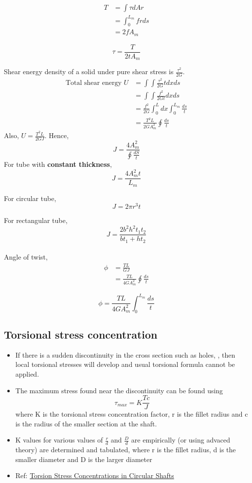 \documentclass{article}
\begin{document}
	\begin{align*}
		T &= \int \tau dA r\\
		  &= \int_0^{L_m} frds\\
		  &= 2 f A_m 
	\end{align*}

	\[\boxed{\tau= \frac{T}{2tA_m}}\]

	Shear energy density of a solid under pure shear stress is $\frac{\tau^2}{2G}$. 
	\begin{align*}
		\text{Total shear energy }U &= \int\int \frac{\tau^2}{2G} t dx ds\\
								   &= \int \int \frac{f^2}{2Gt} dx ds\\
								   &= \frac{f^2}{2G} \int_0^L dx \int_0^{L_m} \frac{ds}{t}\\
								   &= \frac{T^2 L}{2G A_m^2} \oint \frac{ds}{t}
	\end{align*}
	Also, $U = \frac{T^2 L}{2G J}$.
	Hence, 
		\[\boxed{J = \frac{4A_m^2}{\oint\frac{dS}{t}}}\]
	For tube with \textbf{constant thickness},
		\[\boxed{J = \frac{4A_m^2t}{L_m}}\]

	For circular tube,
		\[J= 2\pi r^3 t\]

	For rectangular tube, 
		\[J = \frac{2b^2 h^2 t_1 t_2}{bt_1 + ht_2}\]\\

	Angle of twist,
	\begin{align*}
		\phi &= \frac{TL}{GJ}\\
			 &= \frac{TL}{4GA_m^2}\oint \frac{ds}{t}
	\end{align*}

	\[\boxed{\phi = \frac{TL}{4GA_m^2}\int_0^{L_m} \frac{ds}{t}}\]


	\subsection{Torsional stress concentration}
	\begin{itemize}
		\item If there is a sudden discontinuity in the cross section such as holes, , then local torsional stresses will develop and usual torsional formula cannot be applied.
		\item The maximum stress found near the discontinuity can be found using
		\[\tau_{max} = K \frac{Tc}{J}\]
		where K is the torsional stress concentration factor, r is the fillet radius and c is the radius of the smaller section at the shaft.
		\item K values for various values of $\frac{r}{d}$ and $\frac{D}{d}$ are empirically (or using advaced theory) are determined and tabulated, where r is the fillet radius, d is the smaller diameter and D is the larger diameter
		\item Ref: \href{https://classes.mst.edu/civeng110/concepts/06/concentration/index.html#:~:text=The%20ratio%20of%20the%20true,of%20stress%20raiser%20in%20question.}{Torsion Stress Concentrations in Circular Shafts}
	\end{itemize}
\end{document}
